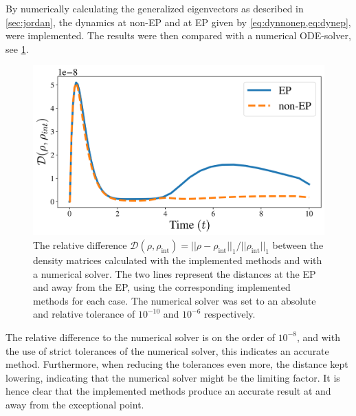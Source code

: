 \documentclass[../main.tex]{subfiles}
\begin{document}
By numerically calculating the generalized eigenvectors as described in \cref{sec:jordan}, the dynamics at non-EP and at EP given by \cref{eq:dynnonep,eq:dynep}, were implemented. The results were then compared with a numerical ODE-solver, see \cref{fig:minevsint}.

\begin{figure}[H]
    \centering
    \includegraphics[width=0.6\linewidth]{figures/minevsint.png}
    \caption{The relative difference $\mathcal{D}(\rho, \rho_\text{int}) = ||\rho - \rho_\text{int}||_1/||\rho_\text{int}||_1$ between the density matrices calculated with the implemented methods and with a numerical solver. The two lines represent the distances at the EP and away from the EP, using the corresponding implemented methods for each case. The numerical solver was set to an absolute and relative tolerance of $10^{-10}$ and $10^{-6}$ respectively.}
    \label{fig:minevsint}
\end{figure}
The relative difference to the numerical solver is on the order of $10^{-8}$, and with the use of strict tolerances of the numerical solver, this indicates an accurate method. Furthermore, when reducing the tolerances even more, the distance kept lowering, indicating that the numerical solver might be the limiting factor. It is hence clear that the implemented methods produce an accurate result at and away from the exceptional point. 
\end{document}
